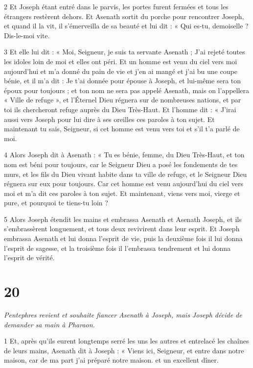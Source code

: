 \par 2 Et Joseph étant entré dans le parvis, les portes furent fermées et tous les étrangers restèrent dehors. Et Asenath sortit du porche pour rencontrer Joseph, et quand il la vit, il s'émerveilla de sa beauté et lui dit : « Qui es-tu, demoiselle ? Dis-le-moi vite.

\par 3 Et elle lui dit : « Moi, Seigneur, je suis ta servante Asenath ; J'ai rejeté toutes les idoles loin de moi et elles ont péri. Et un homme est venu du ciel vers moi aujourd'hui et m'a donné du pain de vie et j'en ai mangé et j'ai bu une coupe bénie, et il m'a dit : Je t'ai donnée pour épouse à Joseph, et lui-même sera ton époux pour toujours ; et ton nom ne sera pas appelé Asenath, mais on l'appellera « Ville de refuge », et l'Éternel Dieu régnera sur de nombreuses nations, et par toi ils chercheront refuge auprès du Dieu Très-Haut. Et l’homme dit : « J’irai aussi vers Joseph pour lui dire à ses oreilles ces paroles à ton sujet. Et maintenant tu sais, Seigneur, si cet homme est venu vers toi et s'il t'a parlé de moi.

\par 4 Alors Joseph dit à Asenath : « Tu es bénie, femme, du Dieu Très-Haut, et ton nom est béni pour toujours, car le Seigneur Dieu a posé les fondements de tes murs, et les fils du Dieu vivant habite dans ta ville de refuge, et le Seigneur Dieu régnera sur eux pour toujours. Car cet homme est venu aujourd’hui du ciel vers moi et m’a dit ces paroles à ton sujet. Et maintenant, viens vers moi, vierge et pure, et pourquoi te tiens-tu loin ?

\par 5 Alors Joseph étendit les mains et embrassa Asenath et Asenath Joseph, et ils s'embrassèrent longuement, et tous deux revivirent dans leur esprit. Et Joseph embrassa Asenath et lui donna l'esprit de vie, puis la deuxième fois il lui donna l'esprit de sagesse, et la troisième fois il l'embrassa tendrement et lui donna l'esprit de vérité.

\chapter{20}

\par \textit{Pentephres revient et souhaite fiancer Asenath à Joseph, mais Joseph décide de demander sa main à Pharaon.}

\par 1 Et, après qu'ils eurent longtemps serré les uns les autres et entrelacé les chaînes de leurs mains, Asenath dit à Joseph : « Viens ici, Seigneur, et entre dans notre maison, car de ma part j'ai préparé notre maison. et un excellent dîner.

